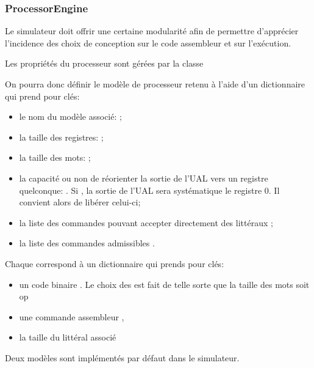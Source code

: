 
\subsubsection{ProcessorEngine}
Le simulateur doit offrir une certaine modularité afin de permettre d'apprécier l'incidence des choix de conception sur le code assembleur et sur l'exécution. 

Les propriétés du processeur sont gérées par la classe 

On pourra donc définir le modèle de processeur retenu à l'aide d'un dictionnaire qui prend pour clés:
\begin{itemize}
	\item le nom du modèle associé: ;
	\item la taille des registres: ;
	\item la taille des mots: ;
	\item la capacité ou non de réorienter la sortie de l'UAL vers un registre quelconque: . Si , la sortie de l'UAL sera systématique le registre 0. Il convient alors de libérer celui-ci; 
	\item la liste des commandes pouvant accepter directement des littéraux ;
	\item la liste des commandes admissibles .
\end{itemize}

Chaque  correspond à un dictionnaire qui prends pour clés:
\begin{itemize}
	\item un code binaire . Le choix des  est fait de telle sorte que la taille des mots soit op
	\item une commande assembleur ,
	\item la taille du littéral associé	
\end{itemize}

Deux modèles sont implémentés par défaut dans le simulateur.

